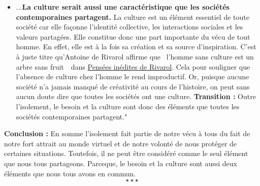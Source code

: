 \begin{enumerate}[label*=$\longrightarrow$]
\begin{itemize}
		\item ...\textbf{La culture serait aussi une caractéristique que les sociétés contemporaines partagent.} La culture est un élément essentiel de toute société car elle façonne l'identité collective, les interactions sociales et les valeurs partagées. Elle constitue donc une part importante du vécu de tout homme. En effet, elle est à la fois sa création et sa source d'inspiration. C'est à juste titre qu'Antoine de Rivarol affirme que \guillemetleft\ l'homme sans culture est un arbre sans fruit\ \guillemetright\ dans \underline{Pensées inédites de Rivarol}. Cela pour souligner que l'absence de culture chez l'homme le rend improductif. Or, puisque aucune société n'a jamais manqué de créativité au cours de l'histoire, on peut sans aucun doute dire que toutes les sociétés ont une culture. \newline \textbf{Transition :} Outre l'isolement, le besoin et la culture sont donc des éléments que toutes les sociétés contemporaines partagent."
	\end{itemize}
\end{enumerate}

\textbf{Conclusion :} En somme l'isolement fait partie de notre vécu à tous du fait de notre fort attrait au monde virtuel et de notre volonté de nous protéger de certaines situations. Toutefois, il ne peut être considéré comme le seul élément que nous tous partageons. Parceque, le besoin et la culture sont aussi deux éléments que nous tous avons en commun.$$\star \star \star$$